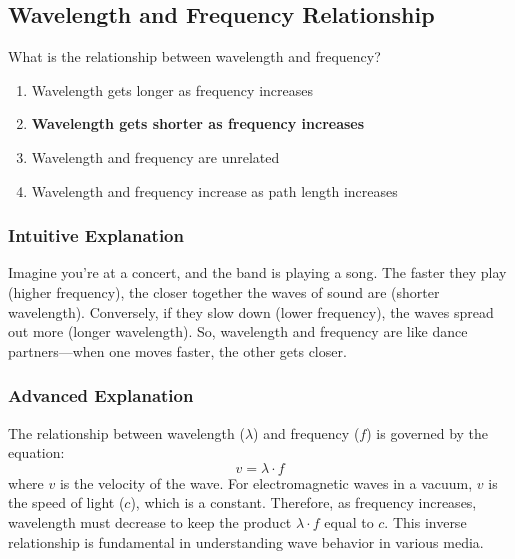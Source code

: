 \subsection{Wavelength and Frequency Relationship}
\label{T3B05}

\begin{tcolorbox}[colback=gray!10!white,colframe=black!75!black,title=T3B05]
What is the relationship between wavelength and frequency?
\begin{enumerate}[noitemsep]
    \item Wavelength gets longer as frequency increases
    \item \textbf{Wavelength gets shorter as frequency increases}
    \item Wavelength and frequency are unrelated
    \item Wavelength and frequency increase as path length increases
\end{enumerate}
\end{tcolorbox}

\subsubsection*{Intuitive Explanation}
Imagine you're at a concert, and the band is playing a song. The faster they play (higher frequency), the closer together the waves of sound are (shorter wavelength). Conversely, if they slow down (lower frequency), the waves spread out more (longer wavelength). So, wavelength and frequency are like dance partners—when one moves faster, the other gets closer.

\subsubsection*{Advanced Explanation}
The relationship between wavelength ($\lambda$) and frequency ($f$) is governed by the equation:
\[
v = \lambda \cdot f
\]
where $v$ is the velocity of the wave. For electromagnetic waves in a vacuum, $v$ is the speed of light ($c$), which is a constant. Therefore, as frequency increases, wavelength must decrease to keep the product $\lambda \cdot f$ equal to $c$. This inverse relationship is fundamental in understanding wave behavior in various media.